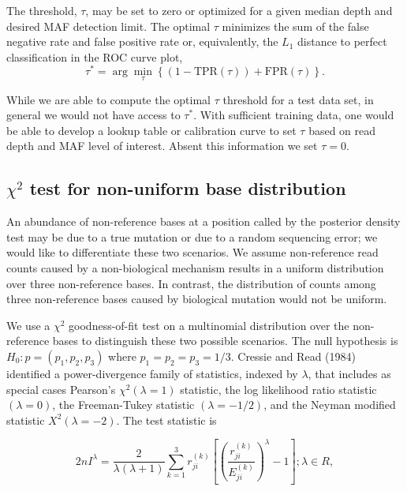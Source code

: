 \documentclass[11pt,reqno]{amsart}
\begin{document}
The threshold, $\tau$, may be set to zero or optimized for a given median depth and desired MAF detection limit. The optimal $\tau$ minimizes the sum of the false negative rate and false positive rate or, equivalently,  the $L_1$ distance to perfect classification in the ROC curve plot,
\begin{equation}
	\tau^* = \arg\min_\tau \left\{ (1-\text{TPR}(\tau)) + \text{FPR}(\tau) \right\}.
\end{equation}

While we are able to compute the optimal $\tau$ threshold for a test data set, in general we would not have access to $\tau^*$. With sufficient training data, one would be able to develop a lookup table or calibration curve to set $\tau$ based on read depth and MAF level of interest. Absent this information we set $\tau = 0$.


\subsection{$\chi^2$ test for non-uniform base distribution}

An abundance of non-reference bases at a position called by the posterior density test may be due to a true mutation or due to a random sequencing error; we would like to differentiate these two scenarios. We assume non-reference read counts caused by a non-biological mechanism results in a uniform distribution over three non-reference bases. In contrast, the distribution of counts among three non-reference bases caused by biological mutation would not be uniform.

We use a $\chi^2$ goodness-of-fit test on a multinomial distribution over the non-reference bases to distinguish these two possible scenarios. The null hypothesis is $H_0: p = (p_1, p_2, p_3)$ where $p_1=p_2=p_3=1/3$. Cressie and Read (1984) identified a power-divergence family of statistics, indexed by $\lambda$, that includes as special cases Pearson's $\chi^2 (\lambda = 1)$ statistic, the log likelihood ratio statistic $(\lambda = 0)$, the Freeman-Tukey statistic $(\lambda = -1/2)$, and the Neyman modified statistic $X^2 (\lambda = -2)$. The test statistic is

\begin{equation}
 2nI^\lambda = \frac{2}{\lambda(\lambda+1)}\sum_{k=1}^3 r_{ji}^{(k)} \left[\left(\frac{r_{ji}^{(k)}}{E_{ji}^{(k)}}\right)^\lambda-1\right];\lambda \in R,
\end{equation}
\end{document}
